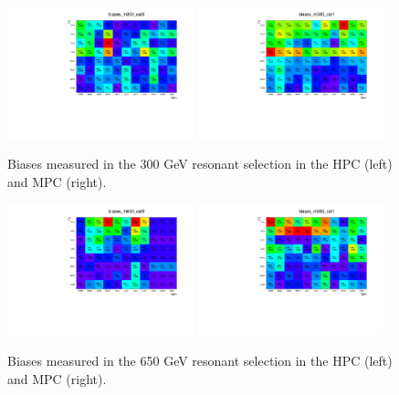 \begin{figure}[h]
  \centering
  \includegraphics[width=0.48\textwidth]{figures/sec-bias/biases_m300_cat0.pdf}\hfil
  \includegraphics[width=0.48\textwidth]{figures/sec-bias/biases_m300_cat1.pdf}\hfil
  \caption{Biases measured in the 300 GeV resonant selection in the HPC (left) and MPC (right).}
  \label{fig:bkg_bias3}
\end{figure}
\begin{figure}[h]
  \centering
  \includegraphics[width=0.48\textwidth]{figures/sec-bias/biases_m650_cat0.pdf}\hfil
  \includegraphics[width=0.48\textwidth]{figures/sec-bias/biases_m650_cat1.pdf}\hfil
  \caption{Biases measured in the 650 GeV resonant selection in the HPC (left) and MPC (right).}
  \label{fig:bkg_bias4}
\end{figure}

